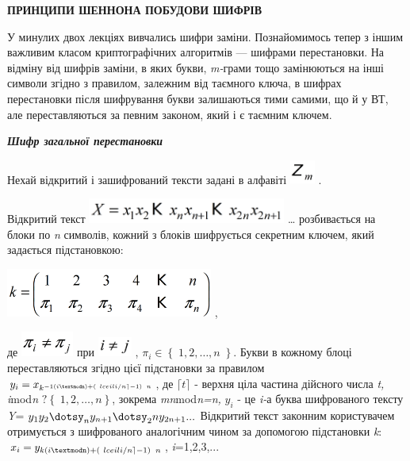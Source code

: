 {\centering\bfseries
ПРИНЦИПИ  ШЕННОНА  ПОБУДОВИ  ШИФРІВ
\par}


\bigskip


\bigskip

У минулих двох лекціях вивчались шифри заміни. Познайомимось тепер з іншим
важливим класом криптографічних алгоритмів --- шифрами перестановки. На відміну
від шифрів заміни, в яких букви, \textit{m}\textit{{}-}грами тощо замінюються
на інші символи згідно з правилом, залежним від таємного ключа, в шифрах
перестановки після шифрування букви залишаються тими самими, що й у ВТ, але
переставляються за певним законом, який і є таємним ключем. 


\bigskip

{\centering\bfseries\itshape
Шифр загальної  перестановки
\par}


\bigskip

Нехай відкритий і зашифрований тексти задані в алфавіті 
\includegraphics[width=0.3228in,height=0.3098in]{crypt-img/crypt-img55.png} .

Відкритий текст 
\includegraphics[width=2.5638in,height=0.3228in]{crypt-img/crypt-img56.png} …
розбивається на блоки по \textit{n }символів, кожний з блоків шифрується
секретним ключем, який задається підстановкою:

{\centering
 \includegraphics[width=2.678in,height=0.6244in]{crypt-img/crypt-img57.png} ,
\par}

де  \includegraphics[width=0.6811in,height=0.3339in]{crypt-img/crypt-img58.png} 
при  \includegraphics[width=0.4402in,height=0.252in]{crypt-img/crypt-img59.png}
,  $\pi _i\in \left\{ \;1,2,\dots,n\; \right\}$. Букви в
кожному блоці переставляються згідно цієї підстановки за правилом 
$y_{i}=x_{k^{{-1}(i\textmodn)+\left(\ lceil i/n\rceil -1 \right)\;\;n}}$,
 де   $\lceil t\rceil $ - верхня ціла частина дійсного числа
\textit{t}\textit{,  } \textit{i}mod\textit{n }
$?\left\{ \;1,2,\dots,n\left. \right\}\right.$, зокрема 
\textit{mn}mod\textit{n}\textit{=}\textit{n}\textit{, } $y_i$  {}- це 
\textit{i}\textit{{}-}а  буква шифрованого тексту \textit{Y}=
$y_{1}y_{2}\dotsy_{n}y_{n+1}\dotsy_2ny_{2n+1}\text{.}\text{.}\text{.}$
Відкритий текст законним користувачем отримується з шифрованого аналогічним
чином за допомогою підстановки \textit{k}:  
$x_{i}=y_{k(i\textmodn)+\left(\ lceil i/n\rceil -1 \right)\;\;n}$, 
\textit{i}=1,2,3,...

